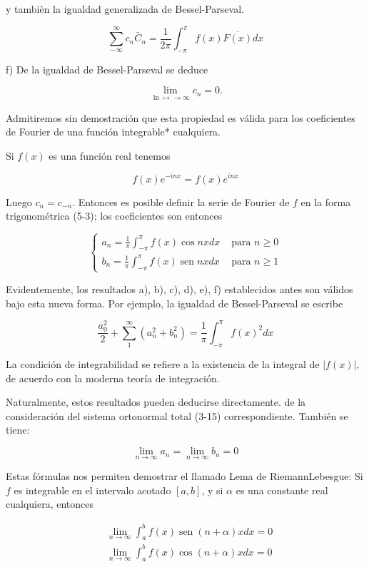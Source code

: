 \documentclass[10pt]{article}
\theoremstyle{plain}
\theoremstyle{definition}
\theoremstyle{remark}
\begin{document}
y tambièn la igualdad generalizada de Bessel-Parseval.

$$
\sum_{-\infty}^{\infty} c_{n} \bar{C}_{n}=\frac{1}{2 \pi} \int_{-\pi}^{\pi} f(x) \overline{F(x)} d x
$$

f) De la igualdad de Bessel-Parseval se deduce

$$
\lim _{\ln \mapsto \rightarrow \infty} c_{n}=0 .
$$

Admitiremos sin demostración que esta propiedad es válida para los coeficientes de Fourier de una función integrable* cualquiera.

Si $f(x)$ es una función real tenemos

$$
f(x) e^{-i n x}=f(x) e^{i n x}
$$

Luego $c_{n}=c_{-n}$. Entonces es posible definir la serie de Fourier de $f$ en la forma trigonométrica (5-3); los coeficientes son entonces

\[
\begin{cases}a_{n}=\frac{1}{\pi} \int_{-\pi}^{\pi} f(x) \cos n x d x & \text { para } n \geqslant 0  \tag{5-9}\\ b_{n}=\frac{1}{\pi} \int_{-\pi}^{\pi} f(x) \operatorname{sen} n x d x & \text { para } n \geqslant 1\end{cases}
\]

Evidentemente, los resultados a), b), c), d), e), f) establecidos antes son válidos bajo esta nueva forma. Por ejemplo, la igualdad de Bessel-Parseval se escribe

$$
\frac{a_{0}^{2}}{2}+\sum_{1}^{\infty}\left(a_{n}^{2}+b_{n}^{2}\right)=\frac{1}{\pi} \int_{-\pi}^{\pi} f(x)^{2} d x
$$

La condición de integrabilidad se refiere a la existencia de la integral de $|f(x)|$, de acuerdo con la moderna teoría de integración.

Naturalmente, estos resultados pueden deducirse directamente. de la consideración del sistema ortonormal total (3-15) correspondiente. También se tiene:


\begin{equation*}
\lim _{n \rightarrow \infty} a_{n}=\lim _{n \rightarrow \infty} b_{n}=0 \tag{5-10}
\end{equation*}


Estas fórmulas nos permiten demostrar el llamado Lema de RiemannLebesgue: Si $f$ es integrable en el intervalo acotado $[a, b]$, y si $\alpha$ es una constante real cualquiera, entonces


\begin{align*}
& \lim _{n \rightarrow \infty} \int_{a}^{b} f(x) \operatorname{sen}(n+\alpha) x d x=0  \tag{5-11}\\
& \lim _{n \rightarrow \infty} \int_{a}^{b} f(x) \cos (n+\alpha) x d x=0 \tag{5-12}
\end{align*}
\end{document}
